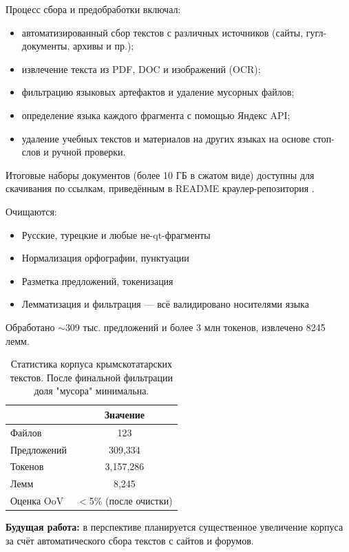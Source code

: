 \documentclass{article}
\begin{document}
Процесс сбора и предобработки включал:
\begin{itemize}
    \item автоматизированный сбор текстов с различных источников (сайты, гугл-документы, архивы и пр.);
    \item извлечение текста из PDF, DOC и изображений (OCR);
    \item фильтрацию языковых артефактов и удаление мусорных файлов;
    \item определение языка каждого фрагмента с помощью Яндекс API;
    \item удаление учебных текстов и материалов на других языках на основе стоп-слов и ручной проверки.
\end{itemize}

Итоговые наборы документов (более 10 ГБ в сжатом виде) доступны для скачивания по ссылкам, приведённым в README краулер-репозитория \cite{qirimtatar_crawlers}.

Очищаются:
\begin{itemize}
    \item Русские, турецкие и любые не-qt-фрагменты
    \item Нормализация орфографии, пунктуации
    \item Разметка предложений, токенизация
    \item Лемматизация и фильтрация — всё валидировано носителями языка
\end{itemize}

Обработано $\sim$309 тыс. предложений и более 3 млн токенов, извлечено 8245 лемм.

\begin{table}[tbh!]
\begin{center}
\begin{tabular}[t]{|l|c|}
\hline
 & Значение \\
\hline
Файлов & 123  \\
Предложений & 309,334 \\
Токенов & 3,157,286 \\
Лемм & 8,245 \\
Оценка OoV & $<$5\% (после очистки) \\
\hline
\end{tabular}
\caption{Статистика корпуса крымскотатарских текстов. После финальной фильтрации доля "мусора" минимальна.}
\label{tab:statistics}
\end{center}
\end{table}

\textbf{Будущая работа:} в перспективе планируется существенное увеличение корпуса за счёт автоматического сбора текстов с сайтов и форумов.
\end{document}
